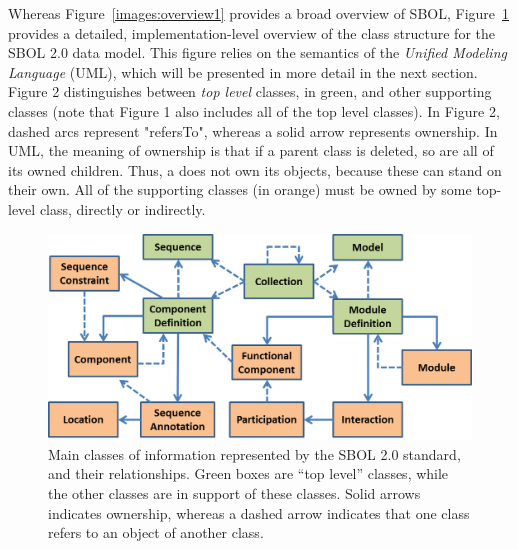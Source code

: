 Whereas Figure~\ref{images:overview1} provides a broad overview of SBOL, Figure~\ref{images:overview2} provides a detailed, implementation-level overview of the class structure for the SBOL 2.0 data model. This figure relies on the semantics of the \emph{Unified Modeling Language} (UML), which will be presented in more detail in the next section. Figure 2 distinguishes between \emph{top level} classes, in green, and other supporting classes (note that Figure 1 also includes all of the top level classes). In Figure 2, dashed arcs represent "refersTo", whereas a solid arrow represents ownership. In UML, the meaning of ownership is that if a parent class is deleted, so are all of its owned children. Thus, a  does not own its
 objects, because these can stand on their own. All of the supporting classes (in orange) must be owned by some top-level class, directly or indirectly. 


\begin{figure}[ht]
\begin{center}
\includegraphics[scale=0.85]{images/OverviewFig2-v4.png}
\caption{Main classes of information represented by the SBOL 2.0 standard, and their relationships.  Green boxes are ``top level'' classes, while the other classes are in support of these classes. Solid arrows indicates ownership, whereas a dashed arrow indicates that one class refers to an object of another class.}
\label{images:overview2}
\end{center}
\end{figure}

